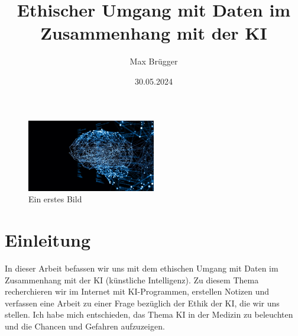 \documentclass{article}
\title{Ethischer Umgang mit Daten im Zusammenhang mit der KI}
\author{Max Brügger}
\date{30.05.2024}
\begin{document}
\maketitle

\begin{figure}[h]
    \centering
    \includegraphics[width=0.5\textwidth]{brain.png}
    \caption{Ein erstes Bild}
\end{figure}

\clearpage

\tableofcontents

\clearpage


\section{Einleitung}
In dieser Arbeit befassen wir uns mit dem ethischen Umgang mit Daten im Zusammenhang mit der KI (künstliche Intelligenz). Zu diesem Thema  recherchieren wir im Internet mit KI-Programmen, erstellen Notizen und verfassen eine Arbeit zu einer Frage bezüglich der Ethik der KI, die wir uns stellen. Ich habe mich entschieden, das Thema KI in der Medizin zu beleuchten und die Chancen und Gefahren aufzuzeigen.
\end{document}
